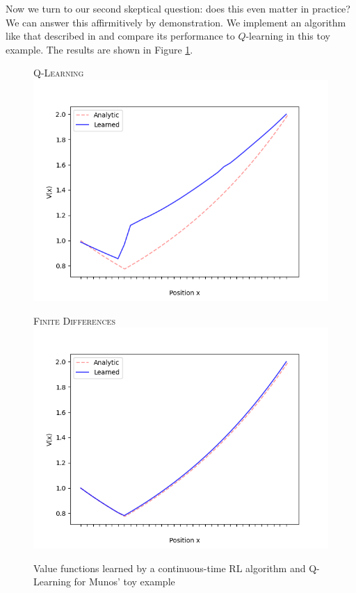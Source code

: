Now we turn to our second skeptical question: does this even matter in
practice? We can answer this affirmitively by demonstration. We
implement an algorithm like that described in
\citet{munos1997convergent} and compare its performance to
$Q$-learning in this toy example. The results are shown in Figure
\ref{fig:munos:value:comparison}.

\begin{figure}[h]
  \centering
  \newcommand{\munosvaluecomparisonscale}{0.38}
  \begin{minipage}[h]{0.49\linewidth}
    \centering\textsc{Q-Learning}\\
    \includegraphics[scale=\munosvaluecomparisonscale]{results/dt-munos-value}
  \end{minipage}%
  \begin{minipage}[h]{0.49\linewidth}
    \centering\textsc{Finite Differences}\\
    \includegraphics[scale=\munosvaluecomparisonscale]{results/ct-munos-value}
  \end{minipage}
  \caption[Failure of Q-learning in continuous time]{Value functions
    learned by a continuous-time RL algorithm and Q-Learning for
    Munos' toy example}
  \label{fig:munos:value:comparison}
\end{figure}

